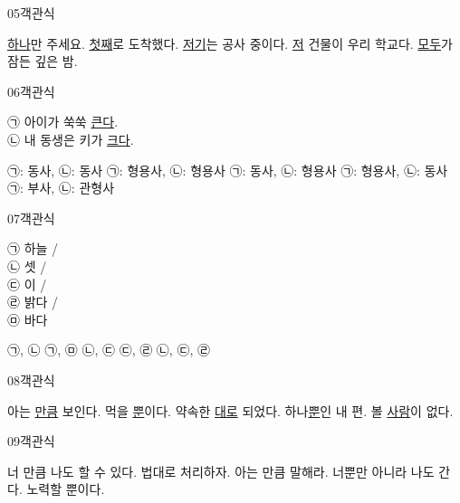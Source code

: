 \documentclass[fs9,seriesRus]{korfarm-base}
\begin{document}
\begin{kfQBlock}{05}{객관식}
\begin{kfChoices}
\kfChoice \uline{하나}만 주세요.
\kfChoice \uline{첫째}로 도착했다.
\kfChoice \uline{저기}는 공사 중이다.
\kfChoice \uline{저} 건물이 우리 학교다.
\kfChoice \uline{모두}가 잠든 깊은 밤.
\end{kfChoices}
\end{kfQBlock}
\begin{kfQBlock}{06}{객관식}
\begin{kfEvidence}㉠ 아이가 쑥쑥 \uline{큰다}. \\\relax
㉡ 내 동생은 키가 \uline{크다}.\end{kfEvidence}
\begin{kfChoices}
\kfChoice ㉠: 동사, ㉡: 동사
\kfChoice ㉠: 형용사, ㉡: 형용사
\kfChoice ㉠: 동사, ㉡: 형용사
\kfChoice ㉠: 형용사, ㉡: 동사
\kfChoice ㉠: 부사, ㉡: 관형사
\end{kfChoices}
\end{kfQBlock}
\begin{kfQBlock}{07}{객관식}
\begin{kfEvidence}㉠ 하늘 / \\\relax
㉡ 셋 / \\\relax
㉢ 이 / \\\relax
㉣ 밝다 / \\\relax
㉤ 바다\end{kfEvidence}
\begin{kfChoices}
\kfChoice ㉠, ㉡
\kfChoice ㉠, ㉤
\kfChoice ㉡, ㉢
\kfChoice ㉢, ㉣
\kfChoice ㉡, ㉢, ㉣
\end{kfChoices}
\end{kfQBlock}
\begin{kfQBlock}{08}{객관식}
\begin{kfChoices}
\kfChoice 아는 \uline{만큼} 보인다.
\kfChoice 먹을 \uline{뿐}이다.
\kfChoice 약속한 \uline{대로} 되었다.
\kfChoice 하나\uline{뿐}인 내 편.
\kfChoice 볼 \uline{사람}이 없다.
\end{kfChoices}
\end{kfQBlock}
\begin{kfQBlock}{09}{객관식}
\begin{kfChoices}
\kfChoice 너 만큼 나도 할 수 있다.
\kfChoice 법대로 처리하자.
\kfChoice 아는 만큼 말해라.
\kfChoice 너뿐만 아니라 나도 간다.
\kfChoice 노력할 뿐이다.
\end{kfChoices}
\end{kfQBlock}
\end{document}
